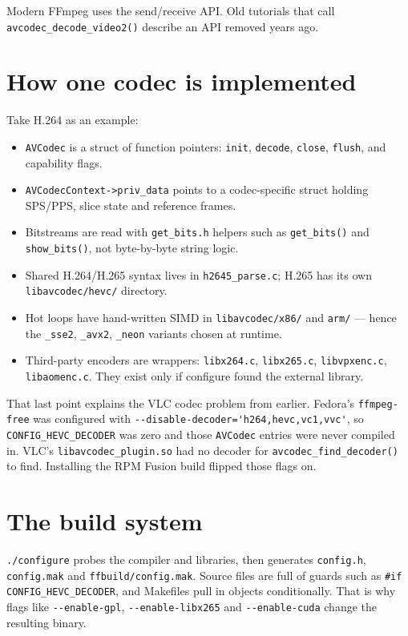 \documentclass[11pt]{article}
\begin{document}
Modern FFmpeg uses the send/receive API. Old tutorials that call
\verb|avcodec_decode_video2()| describe an API removed years ago.

\section{How one codec is implemented}

Take H.264 as an example:

\begin{itemize}
  \item \verb|AVCodec| is a struct of function pointers: \verb|init|,
        \verb|decode|, \verb|close|, \verb|flush|, and capability flags.
  \item \verb|AVCodecContext->priv_data| points to a codec-specific struct
        holding SPS/PPS, slice state and reference frames.
  \item Bitstreams are read with \verb|get_bits.h| helpers such as
        \verb|get_bits()| and \verb|show_bits()|, not byte-by-byte string logic.
  \item Shared H.264/H.265 syntax lives in \verb|h2645_parse.c|; H.265 has its
        own \verb|libavcodec/hevc/| directory.
  \item Hot loops have hand-written SIMD in \verb|libavcodec/x86/| and
        \verb|arm/| --- hence the \verb|_sse2|, \verb|_avx2|, \verb|_neon|
        variants chosen at runtime.
  \item Third-party encoders are wrappers: \verb|libx264.c|, \verb|libx265.c|,
        \verb|libvpxenc.c|, \verb|libaomenc.c|. They exist only if configure
        found the external library.
\end{itemize}

That last point explains the VLC codec problem from earlier. Fedora's
\verb|ffmpeg-free| was configured with
\verb|--disable-decoder='h264,hevc,vc1,vvc'|, so \verb|CONFIG_HEVC_DECODER| was
zero and those \verb|AVCodec| entries were never compiled in. VLC's
\verb|libavcodec_plugin.so| had no decoder for \verb|avcodec_find_decoder()| to
find. Installing the RPM Fusion build flipped those flags on.

\section{The build system}

\verb|./configure| probes the compiler and libraries, then generates
\verb|config.h|, \verb|config.mak| and \verb|ffbuild/config.mak|. Source files
are full of guards such as \verb|#if CONFIG_HEVC_DECODER|, and Makefiles pull
in objects conditionally. That is why flags like \verb|--enable-gpl|,
\verb|--enable-libx265| and \verb|--enable-cuda| change the resulting binary.
\end{document}
